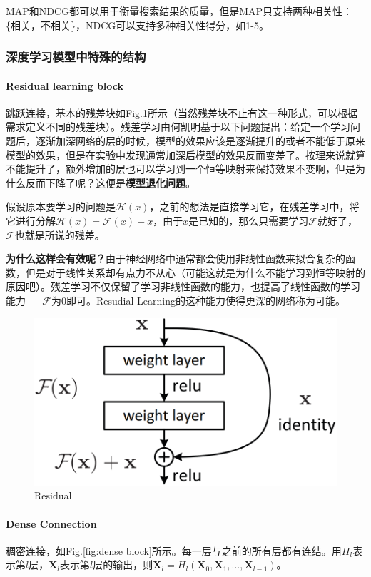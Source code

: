 MAP和NDCG都可以用于衡量搜索结果的质量，但是MAP只支持两种相关性：\{相关，不相关\}，NDCG可以支持多种相关性得分，如1-5。

\subsubsection{深度学习模型中特殊的结构}
\paragraph{Residual learning block}
跳跃连接，基本的残差块如Fig.\ref{fig:residual}所示（当然残差块不止有这一种形式，可以根据需求定义不同的残差块）。残差学习由何凯明基于以下问题提出：给定一个学习问题后，逐渐加深网络的层的时候，模型的效果应该是逐渐提升的或者不能低于原来模型的效果，但是在实验中发现通常加深后模型的效果反而变差了。按理来说就算不能提升了，额外增加的层也可以学习到一个恒等映射来保持效果不变啊，但是为什么反而下降了呢？这便是\textbf{模型退化问题}。

假设原本要学习的问题是$\mathcal{H}(x)$，之前的想法是直接学习它，在残差学习中，将它进行分解$\mathcal{H}(x) = \mathcal{F}(x) + x$，由于$x$是已知的，那么只需要学习$\mathcal{F}$就好了，$\mathcal{F}$也就是所说的残差。

\textbf{为什么这样会有效呢？}由于神经网络中通常都会使用非线性函数来拟合复杂的函数，但是对于线性关系却有点力不从心（可能这就是为什么不能学习到恒等映射的原因吧）。残差学习不仅保留了学习非线性函数的能力，也提高了线性函数的学习能力 --- $\mathcal{F}$为0即可。Resudial Learning的这种能力使得更深的网络称为可能。

\begin{figure}[h]
	\centering
	\includegraphics[width=.4\textwidth]{pics/Residual.png}
	\caption{Residual}
	\label{fig:residual}
\end{figure}

\paragraph{Dense Connection}
稠密连接，如Fig.\ref{fig:dense block}所示。每一层与之前的所有层都有连结。用$H_l$表示第$l$层，$\boldsymbol{X}_l$表示第$l$层的输出，则$\boldsymbol{X}_l = H_l(\boldsymbol{X}_0, \boldsymbol{X}_1, ..., \boldsymbol{X}_{l-1})$。

